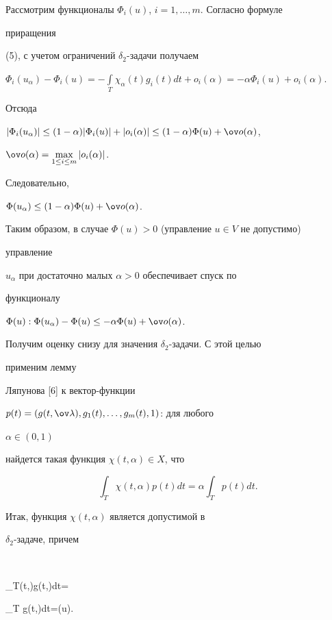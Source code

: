 Рассмотрим функционалы $\Phi_i(u)$, $i=1,\dotsc,m$. Согласно формуле 


приращения 


(5), с учетом ограничений $\delta_2$-задачи получаем 


$\Phi_i(u_\alpha)-\Phi_i(u)=-\int\limits_T\chi_\alpha(t) 


g_i(t)dt+o_i(\alpha)=-\alpha\Phi_i(u)+o_i(\alpha)$. 


Отсюда 


$|\Phi_i(u_\alpha)|\le(1-\alpha)|\Phi_i(u)|+|o_i(\alpha)|\le 


(1-\alpha)\Phi(u)+\ov o(\alpha)$, 


$\ov o(\alpha)=\max\limits_{1\le i\le m}|o_i(\alpha)|$. 


Следовательно, 


$\Phi(u_\alpha)\le(1-\alpha)\Phi(u)+\ov o(\alpha)$. 


 


Таким образом, в случае $\Phi(u)>0$ (управление $u\in V$ не допустимо) 


управление 


$u_\alpha$ при достаточно малых $\alpha>0$ обеспечивает спуск по 


функционалу 


$\Phi(u):\Phi(u_\alpha)-\Phi(u)\le-\alpha\Phi(u)+\ov o(\alpha)$. 


 


Получим оценку снизу для значения $\delta_2$-задачи. С этой целью 


применим лемму 


Ляпунова [6] к вектор-функции 


$p(t)=(g(t,\ov\lambda),g_1(t),\dotsc,g_m(t),1)$: для любого 


$\alpha\in(0,1)$ 


найдется такая функция $\chi(t,\alpha)\in X$, что 


$$ 


\int_T\chi(t,\alpha)p(t)dt=\alpha\int_T p(t)dt. 


$$ 


Итак, функция $\chi(t,\alpha)$ является допустимой в 


$\delta_2$-задаче, причем 


$$ 


\int_T\chi(t,\alpha)g(t,\ov\lambda)dt= 


\alpha\int_T g(t,\ov\lambda)dt=\alpha\delta(u). 


